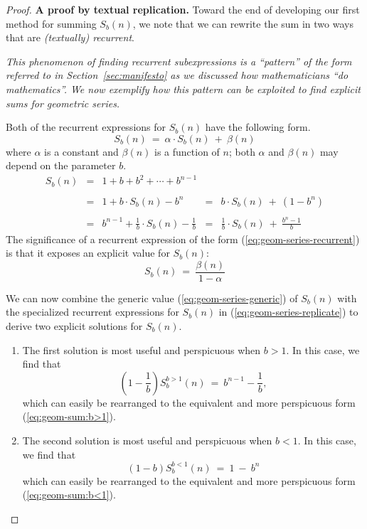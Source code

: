 \begin{proof}
{\bf A proof by textual replication.}
%
Toward the end of developing our first method for summing $S_{b}(n)$,
we note that we can rewrite the sum in two ways that are {\em
  (textually) recurrent}.

\bigskip

\noindent
{\em This phenomenon of {\em finding recurrent subexpressions} is a
  ``pattern'' of the form referred to in Section~\ref{sec:manifesto}
  as we discussed how mathematicians ``do mathematics''.  We now
  exemplify how this pattern can be exploited to find explicit sums
  for geometric series.}

\bigskip

Both of the recurrent expressions for $S_{b}(n)$ have the following form.
\begin{equation}
\label{eq:geom-series-recurrent}
S_b(n) \ = \ \alpha \cdot S_b(n) \ + \ \beta(n)
\end{equation}
where $\alpha$ is a constant and $\beta(n)$ is a function of $n$; both
$\alpha$ and $\beta(n)$ may depend on the parameter $b$.
\begin{equation}
\label{eq:geom-series-replicate}
\begin{array}{cclcl}
S_{b}(n) 
  & = &
1+ b + b^2 + \cdots + b^{n-1} & & \\
  &   &   &  & \\
  & = &
1 + b \cdot S_{b}(n) - b^n
   & = & b \cdot S_{b}(n) \ + \ (1 - b^n) \\
  &   &   &  & \\
  & = &
{\displaystyle
b^{n-1} + \frac{1}{b} \cdot S_{b}(n) - \frac{1}{b}
}
  & = &
{\displaystyle \frac{1}{b} \cdot S_{b}(n) \ + \ \frac{b^n -1}{b} 
}
\end{array}
\end{equation}
The significance of a recurrent expression of the form
(\ref{eq:geom-series-recurrent}) is that it exposes an explicit value
for $S_b(n)$:
\begin{equation}
\label{eq:geom-series-generic}
S_b(n) \ = \ \frac{\beta(n)}{1 - \alpha}
\end{equation}

We can now combine the generic value (\ref{eq:geom-series-generic}) of
$S_b(n)$ with the specialized recurrent expressions for $S_b(n)$ in
(\ref{eq:geom-series-replicate}) to derive two explicit solutions for
$S_b(n)$.
\begin{enumerate}
\item
The first solution is most useful and perspicuous when $b>1$.  In this
case, we find that
\[ \left( 1 - \frac{1}{b} \right)  S^{b>1}_{b}(n) \ = \ b^{n-1} -
\frac{1}{b}, \]
which can easily be rearranged to the equivalent and more
perspicuous form (\ref{eq:geom-sum:b>1}).

\item
The second solution is most useful and perspicuous when $b < 1$.  In this
case, we find that
\[ (1-b) S^{b<1}_{b}(n) \ = \ 1 \ - \ b^n \]
which can easily be rearranged to the equivalent and more
perspicuous form (\ref{eq:geom-sum:b<1}).
\end{enumerate}
\end{proof}

